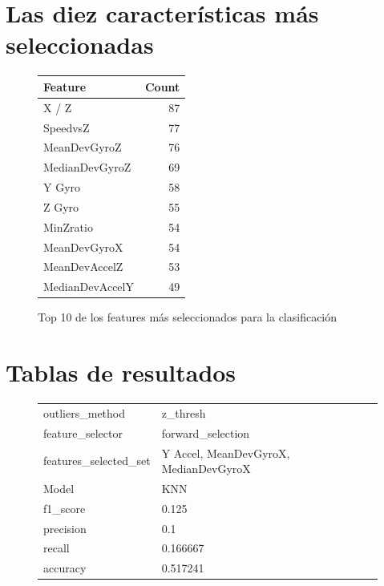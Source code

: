 \begin{appendices}
	\section*{Las diez características más seleccionadas}
	
		\begin{figure}[htb]
			\centering
				\begin{tabular}{lr}
					\toprule
						Feature &  Count \\
					\midrule
					 	 X / Z &     87 \\
			   			SpeedvsZ &     77 \\
		   				MeanDevGyroZ &     76 \\
		 				MedianDevGyroZ &     69 \\
					 	Y Gyro &     58 \\
					 	Z Gyro &     55 \\
			  			MinZratio &     54 \\
		  				MeanDevGyroX &     54 \\
		 				MeanDevAccelZ &     53 \\
						MedianDevAccelY &     49 \\
					\bottomrule
				\end{tabular}
				\caption{Top 10 de los features más seleccionados  para la clasificación}
				\label{table:13}
		\end{figure}
	
	\section*{Tablas de resultados}
		\begin{figure}[htb]
			\centering
			\begin{tabular}{ll}
				\toprule
					  outliers\_method &                                z\_thresh \\
					 feature\_selector &                       forward\_selection \\
				features\_selected\_set & {Y Accel, MeanDevGyroX, MedianDevGyroX} \\
								Model &                                     KNN \\
						f1\_score &                                   0.125 \\
					   precision &                                     0.1 \\
						  recall &                                0.166667 \\
						accuracy &                                0.517241 \\
				\bottomrule
			\end{tabular}
			\newline
			\newline


\end{figure}
\end{appendices}
